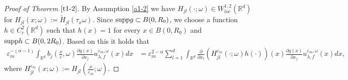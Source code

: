 \documentclass[11pt,draft, reqno]{amsart}
\newcommand{\R}{\mathds R}
\newcommand{\e}{\varepsilon}
\newcommand{\w}{\omega}
\theoremstyle{definition}
\numberwithin{equation}{section}
\begin{document}
\begin{proof} [Proof of Theorem $\ref{t1-2}$]
By Assumption \ref{a1-2} we have $H_{jl}(\cdot;\w)\in W^{1,2}_{loc}(\R^d)$ for $H_{jl}(x;\w):=\tilde H_{jl}(\tau_x \w)$.
Since ${\rm supp}g\subset B(0,R_0)$, we choose a function $h\in C_c^2(\R^d)$ such that
$h(x)=1$ for every $x\in B(0,R_0)$ and ${\rm supp}h \subset B(0,2R_0)$. Based on this it holds that
\begin{align}\label{t1-2-7a}
\e_m^{-(\alpha-1)}\int_{\R^d}b_j\left(\frac{x}{\e},\w\right)\frac{\partial g(x)}{\partial x_j}u_{\lambda,f}^{\e_m,\w}(x)dx&=
\e_m^{2-\alpha}\sum_{l=1}^d\int_{\R^d}  \frac{\partial}{\partial x_l}\left( H_{jl}^{\e_m}\left(\cdot;\w\right)h(\cdot)\right)(x)
\frac{\partial g(x)}{\partial x_j}u_{\lambda,f}^{\e_m,\w}(x)dx,
\end{align}
where $H_{jl}^{\e_m}(x;\w):=H_{jl}\left(\frac{x}{\e_m};\w\right)$.


\end{proof}
\end{document}
